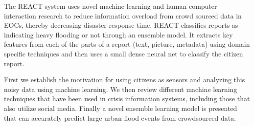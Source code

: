 The REACT system uses novel machine learning and human computer interaction
research to reduce information overload from crowd sourced data in EOCs, thereby
decreasing disaster response time. REACT classifies reports as indicating heavy
flooding or not through an ensemble model. It extracts key features from
each of the parts of a report (text, picture, metadata) using domain specific
techniques and then uses a small dense neural net to classify the citizen
report.

First we establish the motivation for using citizens as sensors and
analyzing this noisy data using machine learning. We then review different
machine learning techniques that have been used in crisis information
systems, including those that also utilize social media.  Finally a novel
ensemble learning model is presented that can accurately predict large urban
flood events from crowdsourced data.
